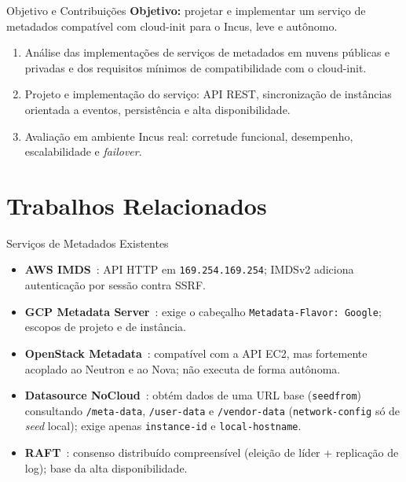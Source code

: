 \documentclass[aspectratio=169,xcolor=table]{beamer}
\begin{document}
\begin{frame}{Objetivo e Contribuições}
    \textbf{Objetivo:} projetar e implementar um serviço de metadados compatível com
    cloud-init para o Incus, leve e autônomo.
    \vspace{0.4cm}
    \begin{enumerate}
        \item Análise das implementações de serviços de metadados em nuvens públicas e
              privadas e dos requisitos mínimos de compatibilidade com o cloud-init.
        \item Projeto e implementação do serviço: API REST, sincronização de
              instâncias orientada a eventos, persistência e alta disponibilidade.
        \item Avaliação em ambiente Incus real: corretude funcional, desempenho,
              escalabilidade e \textit{failover}.
    \end{enumerate}
\end{frame}

\section{Trabalhos Relacionados}
\sectionframe

\begin{frame}{Serviços de Metadados Existentes}
    \begin{itemize}
        \item \textbf{AWS IMDS}~\cite{aws_imds}: API HTTP em \texttt{169.254.169.254};
              IMDSv2 adiciona autenticação por sessão contra SSRF.
        \item \textbf{GCP Metadata Server}~\cite{gcp_metadata}: exige o cabeçalho
              \texttt{Metadata-Flavor: Google}; escopos de projeto e de instância.
        \item \textbf{OpenStack Metadata}~\cite{openstack_metadata}: compatível com a
              API EC2, mas fortemente acoplado ao Neutron e ao Nova; não executa de
              forma autônoma.
        \item \textbf{Datasource NoCloud}~\cite{cloudinit_nocloud}: obtém dados de uma
              URL base (\texttt{seedfrom}) consultando \texttt{/meta-data},
              \texttt{/user-data} e \texttt{/vendor-data} (\texttt{network-config}
              só de \textit{seed} local);
              exige apenas \texttt{instance-id} e \texttt{local-hostname}.
        \item \textbf{RAFT}~\cite{ongaro2014raft}: consenso distribuído compreensível
              (eleição de líder + replicação de log); base da alta disponibilidade.
    \end{itemize}
\end{frame}
\end{document}
